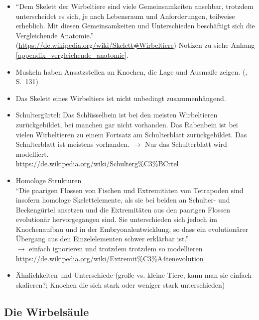 \begin{itemize}
  \item "`Dem Skelett der Wirbeltiere sind viele Gemeinsamkeiten ansehbar, trotzdem unterscheidet es sich, je nach Lebensraum und Anforderungen, teilweise erheblich. Mit diesen Gemeinsamkeiten und Unterschieden beschäftigt sich die Vergleichende Anatomie."' (\url{https://de.wikipedia.org/wiki/Skelett#Wirbeltiere}) Notizen zu \cite{Vergleichende_Anatomie} siehe Anhang \ref{appendix_vergleichende_anatomie}.

 \item Muskeln haben Ansatzstellen an Knochen, die Lage und Ausmaße zeigen. (\cite{Vergleichende_Anatomie}, S.\ 131)
 \item Das Skelett eines Wirbeltiers ist nicht unbedingt zusammenhängend.

 \item Schultergürtel: Das Schlüsselbein ist bei den meisten Wirbeltieren zurückgebildet, bei manchen gar nicht vorhanden. Das Rabenbein ist bei vielen Wirbeltieren zu einem Fortsatz am Schulterblatt zurückgebildet. Das Schulterblatt ist meistens vorhanden. $\rightarrow$ Nur das Schulterblatt wird modelliert.\\
 \url{https://de.wikipedia.org/wiki/Schulterg\%C3\%BCrtel}
 
 \item Homologe Strukturen \\
 "`Die paarigen Flossen von Fischen und Extremitäten von Tetrapoden sind insofern homologe Skelettelemente, als sie bei beiden an Schulter- und Beckengürtel ansetzen und die Extremitäten aus den paarigen Flossen evolutionär hervorgegangen sind.\cite{homology} %
 Sie unterschieden sich jedoch im Knochenaufbau und in der Embryonalentwicklung, so dass ein evolutionärer Übergang aus den Einzelelementen schwer erklärbar ist."'\\
 $\rightarrow$ einfach ignorieren und trotzdem trotzdem so modellieren\\
 \url{https://de.wikipedia.org/wiki/Extremit\%C3\%A4tenevolution}
 
  \item Ähnlichkeiten und Unterschiede (\zb große vs. kleine Tiere, kann man sie einfach skalieren?; Knochen die sich stark oder weniger stark unterschieden)
\end{itemize}

\subsection{Die Wirbelsäule}

